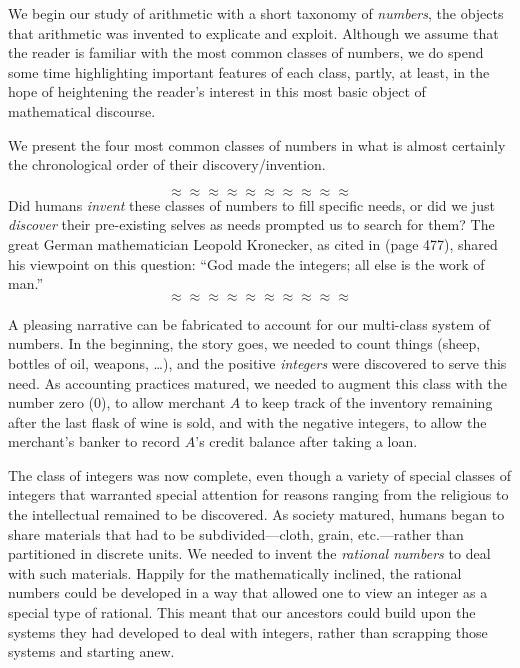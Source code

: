 We begin our study of arithmetic with a short taxonomy of {\it
  numbers}, the objects that arithmetic was invented to explicate and
exploit.  Although we assume that the reader is familiar with the most
common classes of numbers, we do spend some time highlighting
important features of each class, partly, at least, in the hope of
heightening the reader's interest in this most basic object of
mathematical discourse.

We present the four most common classes of numbers in what is almost
certainly the chronological order of their discovery/invention.

\[ \approx \approx \approx \approx \approx \approx \approx \approx \approx \approx \]
Did humans {\em invent} these classes of numbers to fill specific
needs, or did we just {\em discover} their pre-existing selves as
needs prompted us to search for them?  The great German mathematician
Leopold Kronecker, 
as cited in \cite{Bell86} (page 477), shared his viewpoint on this
question: ``God made the integers; all else is the work of man.''
\[ \approx \approx \approx \approx \approx \approx \approx \approx \approx \approx \]

\noindent
A pleasing narrative can be fabricated to account for our multi-class
system of numbers.  In the beginning, the story goes, we needed to
count things (sheep, bottles of oil, weapons, \ldots), and the
positive {\it integers} were discovered to serve
this need.  As accounting practices matured, we needed to augment this
class with the number zero  ($0$), to allow
merchant $A$ to keep track of the inventory remaining after the last
flask of wine is sold, and with the negative integers,
 to allow the merchant's banker to record $A$'s
credit balance after taking a loan.
%
{ }
{}  
%
The class of integers was now complete, even though a variety of
special classes of integers that warranted special attention for
reasons ranging from the religious to the intellectual remained to be
discovered.  As society matured, humans began to share materials that
had to be subdivided---cloth, grain, etc.---rather than partitioned in
discrete units.  We needed to invent the {\it rational numbers}
 to deal with such materials.  Happily for the
mathematically inclined, the rational numbers could be developed in a
way that allowed one to view an integer as a special type of rational.
This meant that our ancestors could build upon the systems they had
developed to deal with integers, rather than scrapping those systems
and starting anew.

